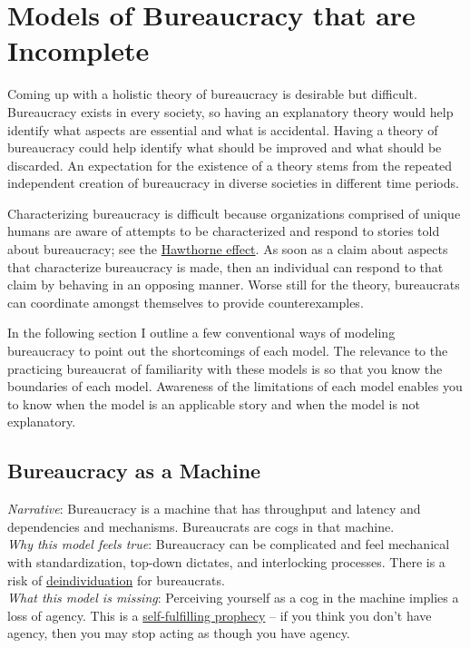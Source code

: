 \section{Models of Bureaucracy that are Incomplete\label{sec:models-of-bureaucracy}}

Coming up with a holistic theory of bureaucracy is desirable but difficult. Bureaucracy exists in every society, so having an explanatory theory would help identify what aspects are essential and what is accidental. Having a theory of bureaucracy could help identify what should be improved and what should be discarded. An expectation for the existence of a theory stems from the repeated independent creation of bureaucracy in diverse societies in different time periods. 

Characterizing bureaucracy is difficult because organizations comprised of unique humans are aware of attempts to be characterized and respond to stories told about bureaucracy; see the \href{https://en.wikipedia.org/wiki/Hawthorne_effect}{Hawthorne effect}. 
As soon as a claim about aspects that characterize bureaucracy is made, then an individual can respond to that claim by behaving in an opposing manner. Worse still for the theory, bureaucrats can coordinate amongst themselves to provide counterexamples. 

In the following section I outline a few conventional ways of modeling bureaucracy to point out the shortcomings of each model. The relevance to the practicing bureaucrat of familiarity with these models is so that you know the boundaries of each model. Awareness of the limitations of each model enables you to know when the model is an applicable story and when the model is not explanatory. 

\subsection*{Bureaucracy as a Machine}

\textit{Narrative}: Bureaucracy is a machine that has throughput and latency and dependencies and mechanisms. Bureaucrats are cogs in that machine.\\
\textit{Why this model feels true}: Bureaucracy can be complicated and feel mechanical with standardization, top-down dictates, and interlocking processes. There is a risk of \href{https://en.wikipedia.org/wiki/Deindividuation}{deindividuation} 
for bureaucrats. \\
\textit{What this model is missing}: Perceiving yourself as a cog in the machine implies a loss of agency. This is a \href{https://en.wikipedia.org/wiki/Self-fulfilling_prophecy}{self-fulfilling prophecy}
-- if you think you don't have agency, then you may stop acting as though you have agency. 


